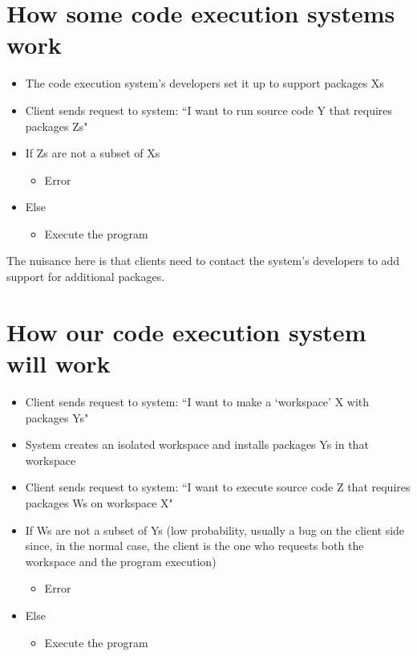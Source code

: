\documentclass[11pt,a4paper]{article}
\begin{document}
\section{\label{traditional-ces}How some code execution systems work}
\begin{itemize}
    \item The code execution system's developers set it up to support packages Xs
    \item Client sends request to system: ``I want to run source code Y that requires packages Zs"
    \item If Zs are not a subset of Xs
          \begin{itemize}
              \item Error
          \end{itemize}
    \item Else
          \begin{itemize}
              \item Execute the program
          \end{itemize}
\end{itemize}
The nuisance here is that clients need to contact the system's developers to add support for additional packages.

\section{How our code execution system will work}
\begin{itemize}
    \item Client sends request to system: ``I want to make a `workspace' X with packages Ys"
    \item System creates an isolated workspace and installs packages Ys in that workspace
    \item Client sends request to system: ``I want to execute source code Z that requires packages Ws on workspace X"
    \item If Ws are not a subset of Ys (low probability, usually a bug on the client side since, in the normal case,
          the client is the one who requests both the workspace and the program execution)
          \begin{itemize}
              \item Error
          \end{itemize}
    \item Else
          \begin{itemize}
              \item Execute the program
          \end{itemize}
\end{itemize}
\end{document}
